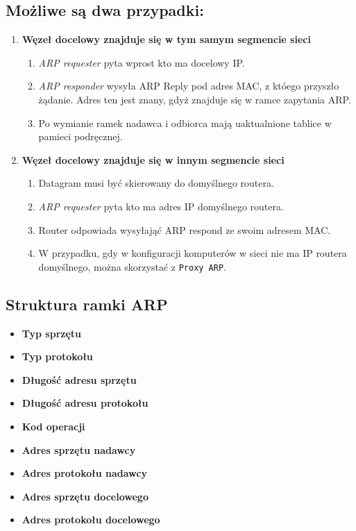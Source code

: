 \documentclass[../sk-egzamin.tex]{subfiles}
\begin{document}
\subsection*{Możliwe są dwa przypadki:}
\begin{enumerate}
    \item \textbf{Węzeł docelowy znajduje się w tym samym segmencie sieci}
    \begin{enumerate}
        \item \textit{ARP requester} pyta wprost kto ma docelowy IP.
        \item \textit{ARP responder} wysyła ARP Reply pod adres MAC, z któego
        przyszło żądanie.
        Adres ten jest znany, gdyż znajduje się w ramce zapytania ARP.
        \item Po wymianie ramek nadawca i odbiorca mają uaktualnione tablice
        w pamieci podręcznej.
    \end{enumerate}

    \item \textbf{Węzeł docelowy znajduje się w innym segmencie sieci}
    \begin{enumerate}
        \item Datagram musi być skierowany do domyślnego routera.
        \item \textit{ARP requester} pyta kto ma adres IP domyślnego routera.
        \item Router odpowiada wysyłająć ARP respond ze swoim adresem MAC.
        \item W przypadku, gdy w konfiguracji komputerów w sieci nie ma IP
        routera domyślnego, można skorzystać z \texttt{Proxy ARP}.
    \end{enumerate}
\end{enumerate}

\subsection*{Struktura ramki ARP}
\begin{itemize}
    \item \textbf{Typ sprzętu} 
    \item \textbf{Typ protokołu} 
    \item \textbf{Długość adresu sprzętu} 
    \item \textbf{Długość adresu protokołu} 
    \item \textbf{Kod operacji} 
    \item \textbf{Adres sprzętu nadawcy} 
    \item \textbf{Adres protokołu nadawcy} 
    \item \textbf{Adres sprzętu docelowego} 
    \item \textbf{Adres protokołu docelowego} 
\end{itemize}
\end{document}
